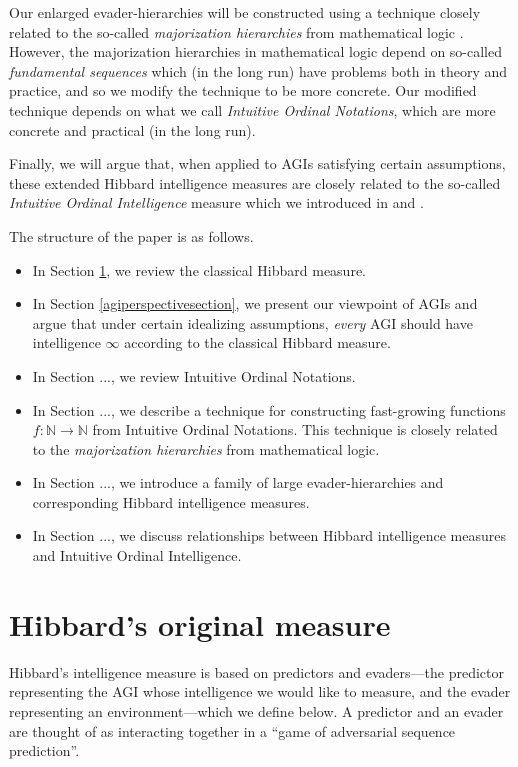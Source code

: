 \documentclass{article}
\begin{document}
Our enlarged evader-hierarchies will be constructed using a technique
closely related to the so-called
\emph{majorization hierarchies} from mathematical logic \cite{weiermann2002slow}.
However, the majorization hierarchies in mathematical logic depend on so-called
\emph{fundamental sequences} which (in the long run) have problems both in
theory and practice, and so we modify the technique to be more concrete. Our modified
technique depends on what we call \emph{Intuitive Ordinal Notations}, which are more
concrete and practical (in the long run).

Finally, we will argue that, when applied to AGIs satisfying certain assumptions,
these extended Hibbard intelligence measures
are closely related to the so-called \emph{Intuitive Ordinal Intelligence} measure
which we introduced in \cite{ioi1} and \cite{ioi2}.

The structure of the paper is as follows.
\begin{itemize}
    \item
    In Section \ref{originalmeasuresection}, we review the classical Hibbard measure.
    \item
    In Section \ref{agiperspectivesection}, we present our viewpoint of AGIs and argue that
    under certain idealizing assumptions, \emph{every} AGI should have intelligence
    $\infty$ according to the classical Hibbard measure.
    \item
    In Section ..., we review Intuitive Ordinal Notations.
    \item
    In Section ..., we describe a technique for constructing fast-growing functions
    $f:\mathbb N\to\mathbb N$ from Intuitive Ordinal Notations. This technique is
    closely related to the \emph{majorization hierarchies} from mathematical logic.
    \item
    In Section ..., we introduce a family of large evader-hierarchies and corresponding
    Hibbard intelligence measures.
    \item
    In Section ..., we discuss relationships between Hibbard intelligence measures
    and Intuitive Ordinal Intelligence.
\end{itemize}

\section{Hibbard's original measure}
\label{originalmeasuresection}

Hibbard's intelligence measure is based on predictors and evaders---the predictor
representing the AGI whose intelligence we would like to measure, and the evader
representing an environment---which we define below. A predictor and an evader
are thought of as interacting together in a ``game of adversarial sequence prediction''.
\end{document}
